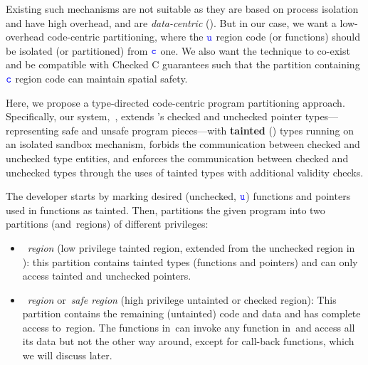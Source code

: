 Existing such mechanisms are not suitable as they are based on process isolation and have high overhead, and are \emph{data-centric} ().
But in our case, we want a low-overhead code-centric partitioning, where the $\textcolor{blue}{\texttt{u}}$ region code (or functions) should be isolated (or partitioned) from $\textcolor{blue}{\texttt{c}}$ one. We also want the technique to co-exist and be compatible with Checked C guarantees such that the partition containing $\textcolor{blue}{\texttt{c}}$ region code can maintain spatial safety.

Here, we propose a type-directed code-centric program partitioning approach.
Specifically, our system,~\systemname, extends \checkedc's checked and unchecked pointer types---representing safe and unsafe program pieces---with \textbf{tainted} (\taintt) types running on an isolated sandbox mechanism,
forbids the communication between checked and unchecked type entities, and enforces the communication between checked and unchecked types
through the uses of tainted types with additional validity checks. 
% 
% 

The developer starts by marking desired (\ie unchecked, $\textcolor{blue}{\texttt{u}}$) functions and pointers used in functions as tainted. 
Then, \systemname partitions the given program into two partitions (\umode and~\cmode regions) of different privileges:

\begin{itemize}
\item~\umode \emph{region} (low privilege tainted region, extended from the unchecked region in \checkedc): this partition contains tainted types (\ie functions and pointers) and can only access tainted and unchecked pointers.
\item~\cmode \emph{region} or~\emph{safe region} (high privilege untainted or checked region): This partition contains the remaining (untainted) code and data and has complete access to~\cmode region.
The functions in~\cregion can invoke any function in~\ucregion and access all its data but not the other way around, except for call-back functions, which we will discuss later.
\end{itemize}

